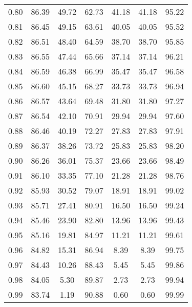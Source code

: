\begin{tabular}{|c|c|c|c|c|c|c|}
      0.80 &     86.39 &     49.72 &      62.73 &   41.18 &      41.18 &         95.22 \\
      0.81 &     86.45 &     49.15 &      63.61 &   40.05 &      40.05 &         95.52 \\
      0.82 &     86.51 &     48.40 &      64.59 &   38.70 &      38.70 &         95.85 \\
      0.83 &     86.55 &     47.44 &      65.66 &   37.14 &      37.14 &         96.21 \\
      0.84 &     86.59 &     46.38 &      66.99 &   35.47 &      35.47 &         96.58 \\
      0.85 &     86.60 &     45.15 &      68.27 &   33.73 &      33.73 &         96.94 \\
      0.86 &     86.57 &     43.64 &      69.48 &   31.80 &      31.80 &         97.27 \\
      0.87 &     86.54 &     42.10 &      70.91 &   29.94 &      29.94 &         97.60 \\
      0.88 &     86.46 &     40.19 &      72.27 &   27.83 &      27.83 &         97.91 \\
      0.89 &     86.37 &     38.26 &      73.72 &   25.83 &      25.83 &         98.20 \\
      0.90 &     86.26 &     36.01 &      75.37 &   23.66 &      23.66 &         98.49 \\
      0.91 &     86.10 &     33.35 &      77.10 &   21.28 &      21.28 &         98.76 \\
      0.92 &     85.93 &     30.52 &      79.07 &   18.91 &      18.91 &         99.02 \\
      0.93 &     85.71 &     27.41 &      80.91 &   16.50 &      16.50 &         99.24 \\
      0.94 &     85.46 &     23.90 &      82.80 &   13.96 &      13.96 &         99.43 \\
      0.95 &     85.16 &     19.81 &      84.97 &   11.21 &      11.21 &         99.61 \\
      0.96 &     84.82 &     15.31 &      86.94 &    8.39 &       8.39 &         99.75 \\
      0.97 &     84.43 &     10.26 &      88.43 &    5.45 &       5.45 &         99.86 \\
      0.98 &     84.05 &      5.30 &      89.87 &    2.73 &       2.73 &         99.94 \\
      0.99 &     83.74 &      1.19 &      90.88 &    0.60 &       0.60 &         99.99 \\
\bottomrule
\end{tabular}
